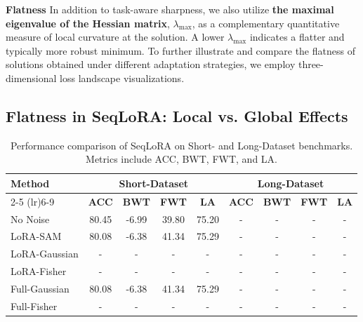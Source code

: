 \documentclass[letterpaper]{article} %
\begin{document}
\textbf{Flatness}
In addition to task-aware sharpness, we also utilize \textbf{the maximal eigenvalue of the Hessian matrix}, $\lambda_{\max}$, as a complementary quantitative measure of local curvature at the solution. A lower $\lambda_{\max}$ indicates a flatter and typically more robust minimum. To further illustrate and compare the flatness of solutions obtained under different adaptation strategies, we employ three-dimensional loss landscape visualizations\cite{liVisualizingLossLandscape2018}.



\subsection{Flatness in SeqLoRA: Local vs. Global Effects}


\begin{table}[t]
\centering
\caption{Performance comparison of SeqLoRA on Short- and Long-Dataset benchmarks. Metrics include ACC, BWT, FWT, and LA.}
\label{tab:seqlora_cl_benchmark}
\begin{tabular}{lcccccccc}
\toprule
\multirow{2}{*}{\textbf{Method}} & \multicolumn{4}{c}{\textbf{Short-Dataset}} & \multicolumn{4}{c}{\textbf{Long-Dataset}} \\
\cmidrule(lr){2-5} \cmidrule(lr){6-9}
& \textbf{ACC} & \textbf{BWT} & \textbf{FWT} & \textbf{LA} & \textbf{ACC} & \textbf{BWT} & \textbf{FWT} & \textbf{LA} \\
\midrule
No Noise         & 80.45 & -6.99 & 39.80 & 75.20 & - & - & - & - \\
LoRA-SAM & 80.08 & -6.38 & 41.34 & 75.29 & - & - & - & - \\
LoRA-Gaussian    & - & - & - & - & - & - & - & - \\
LoRA-Fisher    & - & - & - & - & - & - & - & - \\
Full-Gaussian & 80.08 & -6.38 & 41.34 & 75.29 & - & - & - & - \\
Full-Fisher    & - & - & - & - & - & - & - & - \\
\bottomrule
\end{tabular}
\end{table}
\end{document}
